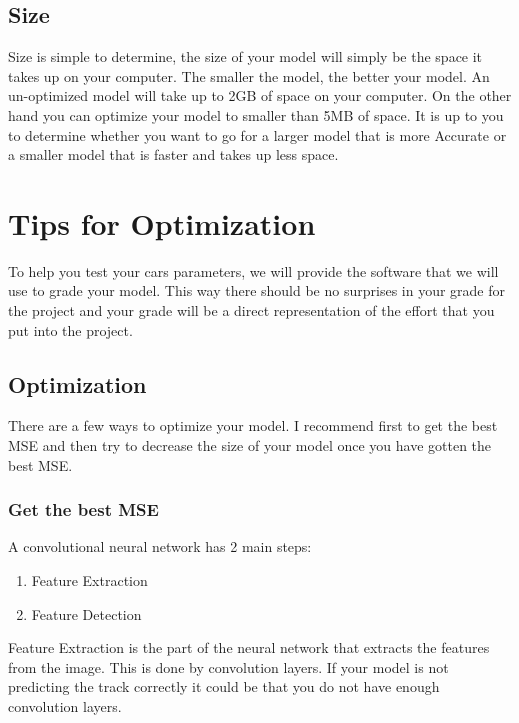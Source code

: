 \documentclass[11pt]{report}
\begin{document}
\section{Size}
Size is simple to determine, the size of your model will simply be the space it takes up on your computer. The smaller the model, the better your model. An un-optimized model will take up to 2GB of space on your computer. On the other hand you can optimize your model to smaller than 5MB of space. It is up to you to determine whether you want to go for a larger model that is more Accurate or a smaller model that is faster and takes up less space.

\chapter{Tips for Optimization}
To help you test your cars parameters, we will provide the software that we will use to grade your model. This way there should be no surprises in your grade for the project and your grade will be a direct representation of the effort that you put into the project.


\section{Optimization}
There are a few ways to optimize your model. I recommend first to get the best MSE and then try to decrease the size of your model once you have gotten the best MSE. 

\subsection{Get the best MSE}
A convolutional neural network has 2 main steps:
\begin{enumerate}
    \item Feature Extraction
    \item Feature Detection
\end{enumerate}

Feature Extraction is the part of the neural network that extracts the features from the image. This is done by convolution layers. If your model is not predicting the track correctly it could be that you do not have enough convolution layers. 
\end{document}

